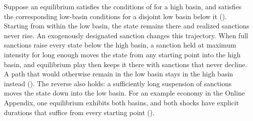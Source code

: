  Suppose an equilibrium satisfies the conditions of
 for a high basin, and satisfies the corresponding low-basin
conditions for a disjoint low basin below it (). Starting from
within the low basin, the state remains there and realized sanctions never rise. An
exogenously designated sanction changes this trajectory. When full sanctions raise
every state below the high basin, a sanction held at maximum intensity for long enough
moves the state from any starting point into the high basin, and equilibrium play then
keeps it there with sanctions that never decline. A path that would otherwise remain in
the low basin stays in the high basin instead (). The reverse also
holds: a sufficiently long suspension of sanctions moves the state down into the low
basin. For an example economy in the Online Appendix, one equilibrium exhibits both
basins, and both shocks have explicit durations that suffice from every starting point
().

